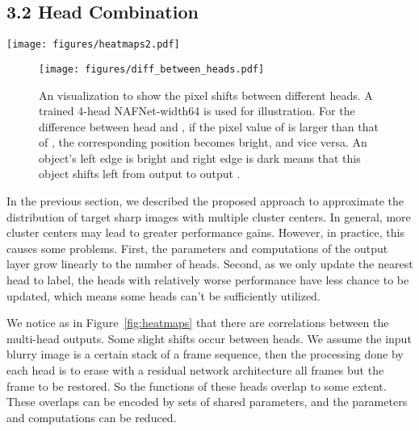 \documentclass[letterpaper]{article} \usepackage{aaai23}  \usepackage{times}  \usepackage{helvet}  \usepackage{courier}  \usepackage[hyphens]{url}  \usepackage{graphicx} \urlstyle{rm} \def\UrlFont{\rm}  \usepackage{natbib}  \usepackage{caption} \frenchspacing  \setlength{\pdfpagewidth}{8.5in} \setlength{\pdfpageheight}{11in} \usepackage{algorithm}
\begin{document}
\subsection{3.2 \quad Head Combination}
\begin{figure*}
    \centering
    \texttt{[image: figures/heatmaps2.pdf]}
    \caption{A heatmap visualization to show the residuals between different heads. A trained 4-head NAFNet-width32 with the head combination is used for illustration. The first row is the sharp image, and the second row is the corresponding blurry image. The heatmaps in the third row are computed by accumulating and normalizing the absolute residuals for all pairs of extended heads. Differences between outputs are mainly in the blurry regions, especially at their edges.}
    \label{fig:heatmaps}
\end{figure*}
\begin{figure}[t]
    \centering
    \texttt{[image: figures/diff\_between\_heads.pdf]}
    \caption{An visualization to show the pixel shifts between different heads. A trained 4-head NAFNet-width64 is used for illustration. For the difference between head  and , if the pixel value of  is larger than that of , the corresponding position becomes bright, and vice versa. An object's left edge is bright and right edge is dark means that this object shifts left from output  to output .}
    \label{fig:diff_between_heads}
\end{figure}








In the previous section, we described the proposed approach to approximate the distribution of target sharp images with multiple cluster centers. In general, more cluster centers may lead to greater performance gains. However, in practice, this causes some problems. First, the parameters and computations of the output layer grow linearly to the number of heads. Second, as we only update the nearest head to label, the heads with relatively worse performance have less chance to be updated, which means some heads can't be sufficiently utilized. 

We notice as in Figure~\ref{fig:heatmaps} that there are correlations between the multi-head outputs. Some slight shifts occur between heads. We assume the input blurry image is a certain stack of a frame sequence, then the processing done by each head is to erase with a residual network architecture all frames but the frame to be restored. So the functions of these heads overlap to some extent. These overlaps can be encoded by sets of shared parameters, and the parameters and computations can be reduced.
\end{document}

